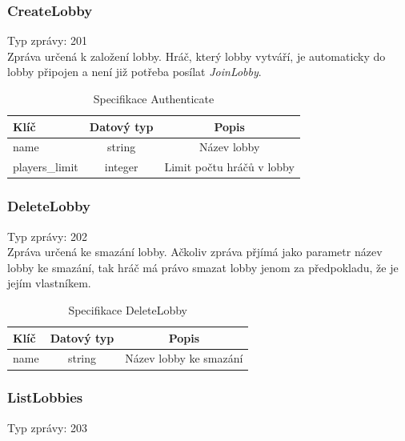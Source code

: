 \documentclass[12pt, a4paper]{article}
\begin{document}
    \subsubsection*{CreateLobby}
    Typ zprávy: 201\\

    Zpráva určená k založení lobby.
    Hráč, který lobby vytváří, je automaticky do lobby připojen a není již potřeba posílat \textit{JoinLobby}.

    \begin{table}[H]
        \centering
        \begin{tabular}{|l|c|c|}
            \hline
            Klíč & Datový typ & Popis\\
            \hline
            \hline
            name & string & Název lobby\\
            \hline
            players\_limit & integer & Limit počtu hráčů v lobby\\
            \hline
        \end{tabular}
        \caption{Specifikace Authenticate}
    \end{table}

    \subsubsection*{DeleteLobby}
    Typ zprávy: 202\\

    Zpráva určená ke smazání lobby.
    Ačkoliv zpráva přjímá jako parametr název lobby ke smazání, tak hráč má právo smazat lobby jenom za předpokladu, že je jejím vlastníkem.

    \begin{table}[H]
        \centering
        \begin{tabular}{|l|c|c|}
            \hline
            Klíč & Datový typ & Popis\\
            \hline
            \hline
            name & string & Název lobby ke smazání\\
            \hline
        \end{tabular}
        \caption{Specifikace DeleteLobby}
    \end{table}

    \subsubsection*{ListLobbies}
    Typ zprávy: 203\\
\end{document}
